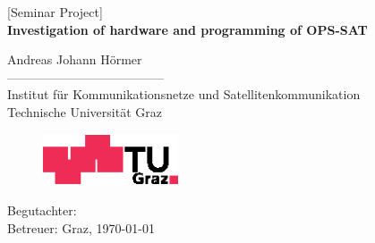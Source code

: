 \begin{titlepage}
\begin{center}
  \vspace*{0.5cm}
  {\LARGE [Seminar Project]} \\
  \vspace{15mm}
  {\huge \bf Investigation of hardware and programming of OPS-SAT \\}

  \vspace{15mm}
  {\LARGE Andreas Johann H\"ormer} \\
  \vspace{10mm}%
  -------------------------------------- \\
  \vspace{10mm}%
  \large
  Institut f\"{u}r Kommunikationsnetze und Satellitenkommunikation \\
  Technische Universit\"{a}t Graz \\


  \vspace{15mm}%
  \begin{figure}[!ht]
  \begin{center}
  \centerline{\includegraphics[width=4cm,keepaspectratio=true]{TULogoneu}}
  \end{center}
  \end{figure}
  \vspace{10mm}
  Begutachter: \\
  Betreuer: 
  \vfill
  Graz, \today
  \vspace{0.5cm}
\end{center}
\end{titlepage}


